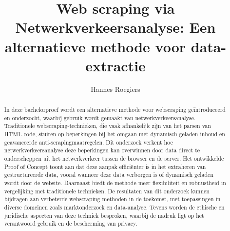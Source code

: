 \documentclass[a0,portrait]{hogent-poster}
\title{Web scraping via Netwerkverkeersanalyse: Een alternatieve methode voor data-extractie}
\author{Hannes Roegiers}
\begin{document}
\maketitle

\begin{abstract}
In deze bachelorproef wordt een alternatieve methode voor webscraping geïntroduceerd en onderzocht, waarbij gebruik wordt gemaakt van netwerkverkeersanalyse. Traditionele webscraping-technieken, die vaak afhankelijk zijn van het parsen van HTML-code, stuiten op beperkingen bij het omgaan met dynamisch geladen inhoud en geavanceerde anti-scrapingmaatregelen. Dit onderzoek verkent hoe netwerkverkeersanalyse deze beperkingen kan overwinnen door data direct te onderscheppen uit het netwerkverkeer tussen de browser en de server. Het ontwikkelde Proof of Concept toont aan dat deze aanpak efficiënter is in het extraheren van gestructureerde data, vooral wanneer deze data verborgen is of dynamisch geladen wordt door de website. Daarnaast biedt de methode meer flexibiliteit en robuustheid in vergelijking met traditionele technieken. De resultaten van dit onderzoek kunnen bijdragen aan verbeterde webscraping-methoden in de toekomst, met toepassingen in diverse domeinen zoals marktonderzoek en data-analyse. Tevens worden de ethische en juridische aspecten van deze techniek besproken, waarbij de nadruk ligt op het verantwoord gebruik en de bescherming van privacy.
\end{abstract}
\end{document}
